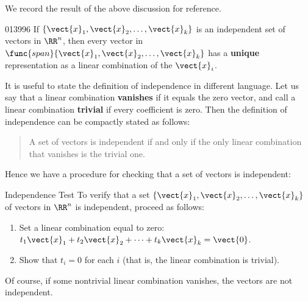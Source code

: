 \noindent We record the result of the above discussion for reference.

\begin{theorem}{}{013996} %
If $\{\vect{x}_{1}, \vect{x}_{2}, \dots, \vect{x}_{k}\}$ is an independent set of vectors in $\RR^n$, then every vector in $\func{span}\{\vect{x}_{1}, \vect{x}_{2}, \dots, \vect{x}_{k}\}$ has a \textbf{unique} representation as a linear combination of the $\vect{x}_{i}$.
\end{theorem}

It is useful to state the definition of independence in different
language. Let us say that a linear combination \textbf{vanishes}  if it equals the zero vector, and
call a linear combination \textbf{trivial}   if every coefficient is zero. Then the definition of independence can be compactly stated as follows:

\begin{quotation}
\noindent A set of vectors is independent if and only if the only linear combination that vanishes is the trivial one. 

\end{quotation}
Hence we have a procedure for checking that a set of vectors is independent:

\begin{theorem*}[label=thm:014011]{Independence Test}
To verify that a set $\{\vect{x}_{1}, \vect{x}_{2}, \dots, \vect{x}_{k}\}$ of vectors in $\RR^n$ is independent, proceed as follows:

\begin{enumerate}
\item Set a linear combination equal to zero: $t_{1}\vect{x}_{1} + t_{2}\vect{x}_{2} + \dots + t_{k}\vect{x}_{k} = \vect{0}$.

\item Show that $t_i = 0$ for each $i$ (that is, the linear combination is trivial).

\end{enumerate}

Of course, if some nontrivial linear combination vanishes, the vectors are not independent.
\end{theorem*}

